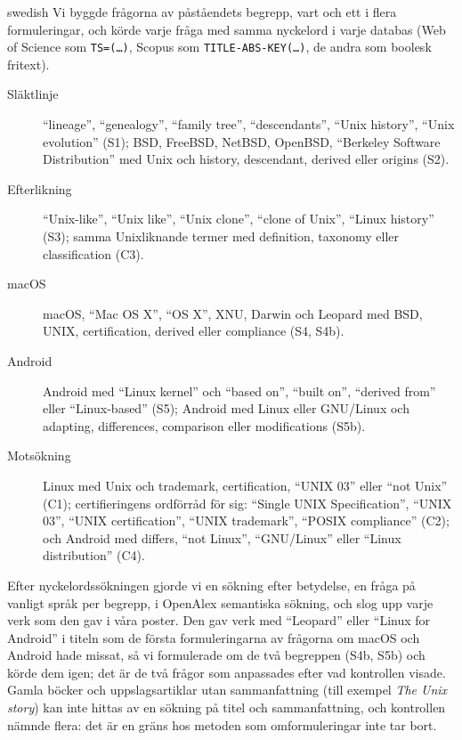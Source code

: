 \begin{onlyin}{swedish}
Vi byggde frågorna av påståendets begrepp, vart och ett i flera
formuleringar, och körde varje fråga med samma nyckelord i varje databas
(Web of Science som \texttt{TS=(\dots)}, Scopus som
\texttt{TITLE-ABS-KEY(\dots)}, de andra som boolesk fritext).
\begingroup\raggedright
\begin{description}
  \item[Släktlinje] \enquote{lineage},
    \enquote{genealogy}, \enquote{family tree}, \enquote{descendants},
    \enquote{Unix history}, \enquote{Unix evolution} (S1); BSD, FreeBSD,
    NetBSD, OpenBSD, \enquote{Berkeley Software Distribution} med Unix
    och history, descendant, derived eller origins (S2).
  \item[Efterlikning] \enquote{Unix-like}, \enquote{Unix like},
    \enquote{Unix clone}, \enquote{clone of Unix}, \enquote{Linux
    history} (S3); samma Unixliknande termer med definition, taxonomy
    eller classification (C3).
  \item[macOS] macOS, \enquote{Mac OS X}, \enquote{OS X}, XNU, Darwin
    och Leopard med BSD, UNIX, certification, derived eller compliance
    (S4, S4b).
  \item[Android] Android med \enquote{Linux kernel} och \enquote{based
    on}, \enquote{built on}, \enquote{derived from} eller
    \enquote{Linux-based} (S5); Android med Linux eller GNU/Linux och
    adapting, differences, comparison eller modifications (S5b).
  \item[Motsökning] Linux med Unix och trademark, certification,
    \enquote{UNIX 03} eller \enquote{not Unix} (C1); certifieringens
    ordförråd för sig: \enquote{Single UNIX Specification},
    \enquote{UNIX 03}, \enquote{UNIX certification}, \enquote{UNIX
    trademark}, \enquote{POSIX compliance} (C2); och Android med
    differs, \enquote{not Linux}, \enquote{GNU/Linux} eller
    \enquote{Linux distribution} (C4).
\end{description}
\par\endgroup
Efter nyckelordssökningen gjorde vi en sökning efter betydelse, en fråga
på vanligt språk per begrepp, i OpenAlex semantiska sökning, och slog
upp varje verk som den gav i våra poster.
Den gav verk med \enquote{Leopard} eller \enquote{Linux for Android} i
titeln som de första formuleringarna av frågorna om macOS och Android
hade missat, så vi formulerade om de två begreppen (S4b, S5b) och körde
dem igen; det är de två frågor som anpassades efter vad kontrollen
visade.
Gamla böcker och uppslagsartiklar utan sammanfattning (till exempel
\emph{The Unix story}) kan inte hittas av en sökning på titel och
sammanfattning, och kontrollen nämnde flera: det är en gräns hos metoden
som omformuleringar inte tar bort.
\end{onlyin}

